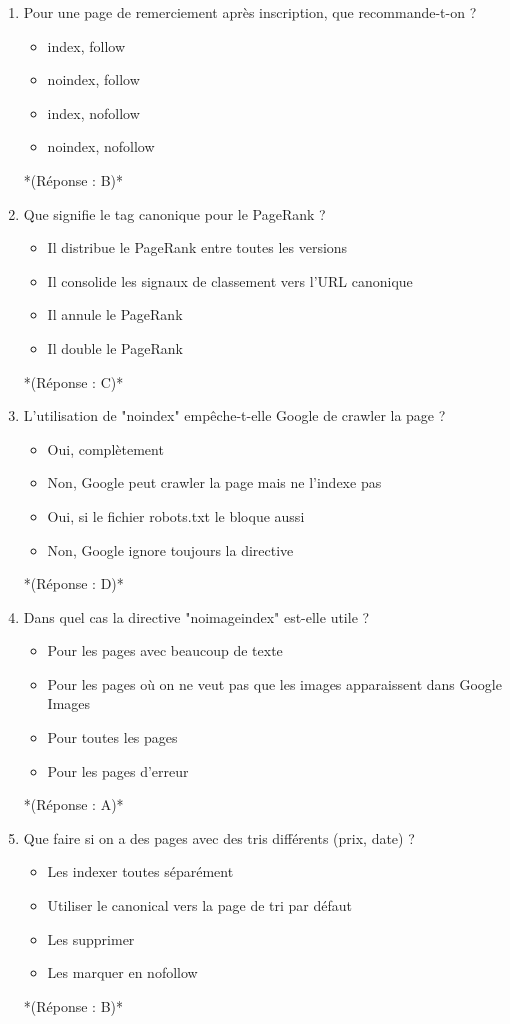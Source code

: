 \documentclass[12pt,a4paper,twoside]{report}
\begin{document}
\begin{enumerate}
\item Pour une page de remerciement après inscription, que recommande-t-on ?
\begin{itemize}
\item[A)] index, follow
\item[B)] noindex, follow
\item[C)] index, nofollow
\item[D)] noindex, nofollow
\end{itemize}
*(Réponse : B)*

\item Que signifie le tag canonique pour le PageRank ?
\begin{itemize}
\item[A)] Il distribue le PageRank entre toutes les versions
\item[B)] Il consolide les signaux de classement vers l'URL canonique
\item[C)] Il annule le PageRank
\item[D)] Il double le PageRank
\end{itemize}
*(Réponse : C)*

\item L'utilisation de "noindex" empêche-t-elle Google de crawler la page ?
\begin{itemize}
\item[A)] Oui, complètement
\item[B)] Non, Google peut crawler la page mais ne l'indexe pas
\item[C)] Oui, si le fichier robots.txt le bloque aussi
\item[D)] Non, Google ignore toujours la directive
\end{itemize}
*(Réponse : D)*

\item Dans quel cas la directive "noimageindex" est-elle utile ?
\begin{itemize}
\item[A)] Pour les pages avec beaucoup de texte
\item[B)] Pour les pages où on ne veut pas que les images apparaissent dans Google Images
\item[C)] Pour toutes les pages
\item[D)] Pour les pages d'erreur
\end{itemize}
*(Réponse : A)*

\item Que faire si on a des pages avec des tris différents (prix, date) ?
\begin{itemize}
\item[A)] Les indexer toutes séparément
\item[B)] Utiliser le canonical vers la page de tri par défaut
\item[C)] Les supprimer
\item[D)] Les marquer en nofollow
\end{itemize}
*(Réponse : B)*


\end{enumerate}
\end{document}
